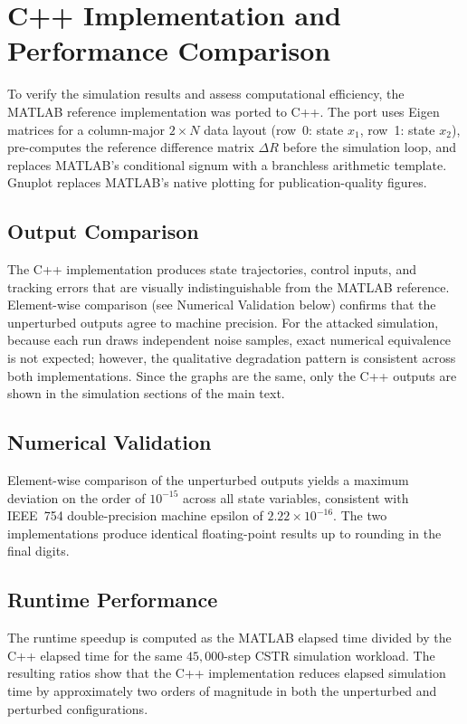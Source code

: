 \section{C++ Implementation and Performance Comparison}
\label{sec:cpp-implementation}

To verify the simulation results and assess computational efficiency, the
MATLAB reference implementation was ported to C++. The port uses Eigen
matrices for a column-major $2 \times N$ data layout (row~0: state
$x_1$, row~1: state $x_2$), pre-computes the reference difference
matrix $\Delta R$ before the simulation loop, and replaces MATLAB's
conditional signum with a branchless arithmetic template. Gnuplot replaces
MATLAB's native plotting for publication-quality figures.

\subsection{Output Comparison}

The C++ implementation produces state trajectories, control inputs, and
tracking errors that are visually indistinguishable from the MATLAB reference.
Element-wise comparison (see Numerical Validation below) confirms that the
unperturbed outputs agree to machine precision. For the attacked simulation,
because each run draws independent noise samples, exact numerical equivalence
is not expected; however, the qualitative degradation pattern is consistent
across both implementations. Since the graphs are the same, only the C++
outputs are shown in the simulation sections of the main text.

\subsection{Numerical Validation}

Element-wise comparison of the unperturbed outputs yields a maximum
deviation on the order of $10^{-15}$ across all state variables, consistent
with IEEE~754 double-precision machine epsilon of
$2.22 \times 10^{-16}$. The two implementations produce identical
floating-point results up to rounding in the final digits.

\subsection{Runtime Performance}



The runtime speedup is computed as the MATLAB elapsed time divided by the C++
elapsed time for the same $45{,}000$-step CSTR simulation workload. The resulting
ratios show that the C++ implementation reduces elapsed simulation time by
approximately two orders of magnitude in both the unperturbed and perturbed
configurations.
